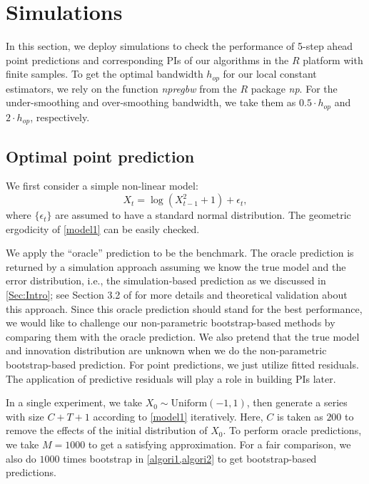 \documentclass[a4paper]{article}
\begin{document}
 

\section{Simulations}\label{Sec:simulation}
In this section, we deploy simulations to check the performance of 5-step ahead point predictions and corresponding PIs of our algorithms in the $R$ platform with finite samples. To get the optimal bandwidth $h_{op}$ for our local constant estimators, we rely on the function \textit{npregbw} from the $R$ package \textit{np}. For the under-smoothing and over-smoothing bandwidth, we take them as $0.5\cdot h_{op}$ and $2\cdot h_{op}$, respectively.

\subsection{Optimal point prediction}
We first consider a simple non-linear model:
\begin{equation}\label{model1}
    X_t = \log(X_{t-1}^2 + 1) + \epsilon_t,
\end{equation}
where $\{\epsilon_t\}$ are assumed to have a standard normal distribution. The geometric ergodicity of \cref{model1} can be easily checked. 

We apply the ``oracle'' prediction to be the benchmark. The oracle prediction is returned by a simulation approach assuming we know the true model and the error distribution, i.e., the simulation-based prediction as we discussed in \cref{Sec:Intro}; see Section 3.2 of \cite{wu2023bootstrap} for more details and theoretical validation about this approach. Since this oracle prediction should stand for the best performance, we would like to challenge our non-parametric bootstrap-based methods by comparing them with the oracle prediction. We also pretend that the true model and innovation distribution are unknown when we do the non-parametric bootstrap-based prediction. For point predictions, we just utilize fitted residuals. The application of predictive residuals will play a role in building PIs later.

In a single experiment, we take $X_0\sim \text{Uniform}(-1,1)$, then generate a series with size $C+T+1$ according to \cref{model1} iteratively. Here, $C$ is taken as $200$ to remove the effects of the initial distribution of $X_0$. To perform oracle predictions, we take $M = 1000$ to get a satisfying approximation. For a fair comparison, we also do
$1000$ times bootstrap in \cref{algori1,algori2} to get bootstrap-based predictions. 
\end{document}
